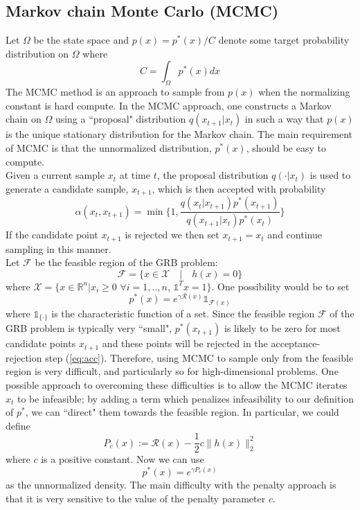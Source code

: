 {\subsection{Markov chain Monte Carlo (MCMC)}
Let $\Omega$ be the state space and $p(x) = p^*(x)/C$ denote some target probability distribution on $\Omega$ where 
\begin{equation}
C = \int_{\Omega} p^*(x) dx
\end{equation}
The MCMC method is an approach to sample from $p(x)$ when the normalizing constant is hard compute. In the MCMC approach, one
constructs a Markov chain on $\Omega$ using a \textquotedblleft proposal" distribution $q(x_{t+1}|x_t)$ in such a way that $p(x)$
is the unique stationary distribution for the Markov chain. The main requirement of MCMC is that the unnormalized distribution, $p^*(x)$, should be easy to compute. \\
Given a current sample $x_t$ at time $t$, the proposal distribution $q(\cdot | x_t)$ is used to generate
a candidate sample, $x_{t+1}$, which is then accepted with probability
\begin{equation}\label{eq:acc}
\alpha(x_t, x_{t+1}) = \min \Big\{ 1, \frac{q(x_t|x_{t+1})p^*(x_{t+1})}{q(x_{t+1}|x_t)p^*(x_t)}\Big\}
\end{equation}
If the candidate point $x_{t+1}$ is rejected we then set $x_{t+1} = x_t$ and continue sampling in this manner.\\
Let $\mathcal{F}$ be the feasible region of the GRB problem:
\begin{equation}
\mathcal{F} = \{ x \in \mathcal{X}\quad|\quad h(x) = 0\}
\end{equation}
where $\mathcal{X} = \{x \in \mathbb{R}^n | x_i \geq 0$ $\forall i=1,..,n$, $\mathds{1}^T x = 1\}$. One possibility would be to set
\begin{equation}
p^*(x) = e^{\gamma \mathcal{R}(x)}\mathds{1}_{\mathcal{F}(x)} 
\end{equation}
where $\mathds{1}_{\{\cdot\}}$ is the characteristic function of a set. Since the feasible region $\mathcal{F}$ of the GRB problem is typically very \textquotedblleft small", $p^*(x_{t+1})$ is likely to be zero for most candidate points $x_{t+1}$ and these points will be rejected in the acceptance-rejection step (\ref{eq:acc}). Therefore, using MCMC to sample only from the feasible region is very difficult, and particularly so for high-dimensional problems. One possible approach to overcoming these difficulties is to allow the MCMC iterates $x_t$ to be infeasible; by adding a term which penalizes infeasibility to our definition of $p^*$, we can \textquotedblleft direct" them towards the feasible region. In particular, we could define
\begin{equation}
P_c(x) := \mathcal{R}(x) - \frac{1}{2} c \parallel h(x) \parallel^2_2
\end{equation}
where $c$ is a positive constant. Now we can use
\begin{equation}
p^*(x) = e^{\gamma P_c(x)}
\end{equation}
as the unnormalized density. The main difficulty with the penalty approach is that it is very sensitive to the value of the penalty parameter $c$.

}
